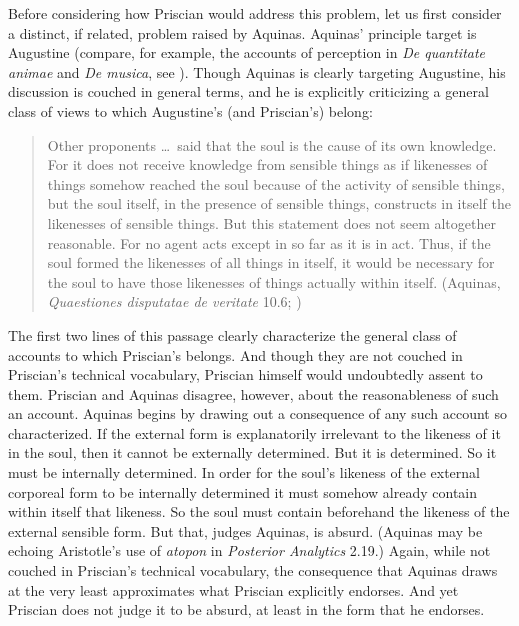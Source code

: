 \documentclass[12pt]{article}
\begin{document}
Before considering how Priscian would address this problem, let us first consider a distinct, if related, problem raised by Aquinas. Aquinas' principle target is Augustine (compare, for example, the accounts of perception in \emph{De quantitate animae} and \emph{De musica}, see \citealt[208--210, n.73]{Colleran:1949ys}). Though Aquinas is clearly targeting Augustine, his discussion is couched in general terms, and he is explicitly criticizing a general class of views to which Augustine's (and Priscian's) belong:
\begin{quote}
	Other proponents \ldots\ said that the soul is the cause of its own knowledge. For it does not receive knowledge from sensible things as if likenesses of things somehow reached the soul because of the activity of sensible things, but the soul itself, in the presence of sensible things, constructs in itself the likenesses of sensible things. But this statement does not seem altogether reasonable. For no agent acts except in so far as it is in act. Thus, if the soul formed the likenesses of all things in itself, it would be necessary for the soul to have those likenesses of things actually within itself. (Aquinas, \emph{Quaestiones disputatae de veritate} 10.6; \citealt[24]{James-V.-McGlynn:1953rz})
\end{quote}
The first two lines of this passage clearly characterize the general class of accounts to which Priscian's belongs. And though they are not couched in Priscian's technical vocabulary, Priscian himself would undoubtedly assent to them. Priscian and Aquinas disagree, however, about the reasonableness of such an account. Aquinas begins by drawing out a consequence of any such account so characterized. If the external form is explanatorily irrelevant to the likeness of it in the soul, then it cannot be externally determined. But it is determined. So it must be internally determined. In order for the soul's likeness of the external corporeal form to be internally determined it must somehow already contain within itself that likeness. So the soul must contain beforehand the likeness of the external sensible form. But that, judges Aquinas, is absurd. (Aquinas may be echoing Aristotle's use of \emph{atopon} in \emph{Posterior Analytics} 2.19.) Again, while not couched in Priscian's technical vocabulary, the consequence that Aquinas draws at the very least approximates what Priscian explicitly endorses. And yet Priscian does not judge it to be absurd, at least in the form that he endorses.
\end{document}
